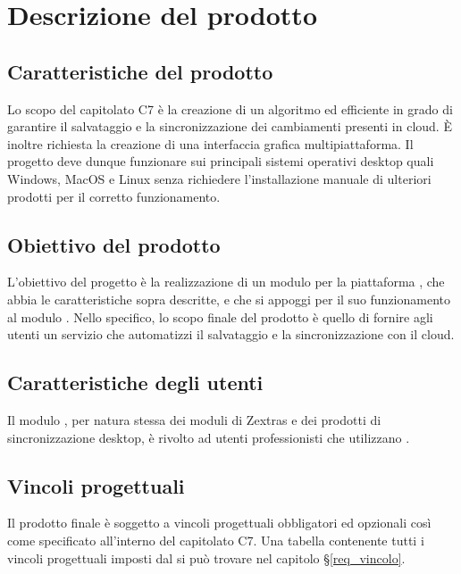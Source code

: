 \section{Descrizione del prodotto}
\subsection{Caratteristiche del prodotto}
Lo scopo del capitolato C7 è la creazione di un algoritmo  ed efficiente in grado di garantire il salvataggio e la sincronizzazione dei cambiamenti presenti in cloud. È inoltre richiesta la creazione di una interfaccia grafica multipiattaforma. Il progetto deve dunque funzionare sui principali sistemi operativi desktop quali Windows, MacOS e Linux senza richiedere l'installazione manuale di ulteriori prodotti per il corretto funzionamento. 
\subsection{Obiettivo del prodotto}
L'obiettivo del progetto è la realizzazione di un modulo per la piattaforma , che abbia le caratteristiche sopra descritte, e che si appoggi per il suo funzionamento al modulo .
Nello specifico, lo scopo finale del prodotto è quello di fornire agli utenti un servizio che automatizzi il salvataggio e la sincronizzazione con il cloud.
\subsection{Caratteristiche degli utenti}
Il modulo \progetto{}, per natura stessa dei moduli di Zextras e dei prodotti di sincronizzazione desktop, è rivolto ad utenti professionisti che utilizzano . 
\subsection{Vincoli progettuali}
Il prodotto  finale è soggetto a vincoli progettuali obbligatori ed opzionali così come specificato all'interno del capitolato C7.
Una tabella contenente tutti i vincoli progettuali imposti dal  si può trovare nel capitolo \S{}\ref{req_vincolo}.